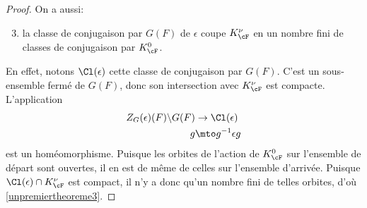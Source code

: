 \begin{proof}
On a aussi:
\begin{enumerate}\setcounter{enumi}{2}
\item\label{unpremiertheoreme3}
la classe de conjugaison par $G(F)$ de $\epsilon$ coupe $K_{\cF}^{\nu}$ en un nombre fini de classes de conjugaison par $K_{\cF}^0$.
\end{enumerate}

En effet, notons $\Cl(\epsilon)$ cette classe de conjugaison par $G(F)$. C'est un sous-ensemble fermé de $G(F)$, donc son intersection avec $K_{\cF}^{\nu}$ est compacte. L'application
\begin{align*}
Z_{G}(\epsilon)(F)\backslash G(F)&\to \Cl(\epsilon)\\
g&\mto g^{-1}\epsilon g
\end{align*}
est un homéomorphisme. Puisque les orbites de l'action de $K_{\cF}^{0}$ sur l'ensemble de départ sont ouvertes, il en est de même de celles sur l'ensemble d'arrivée. Puisque $\Cl(\epsilon)\cap K_{\cF}^{\nu}$ est compact, il n'y a donc qu'un nombre fini de telles orbites, d'où \eqref{unpremiertheoreme3}.


\end{proof}
